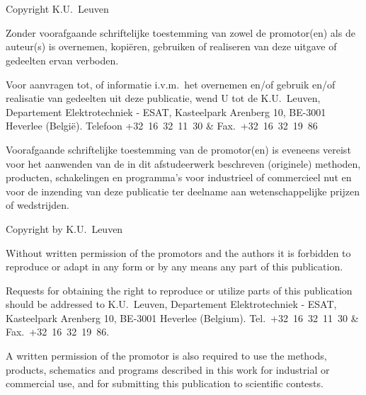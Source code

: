 \section*{}
\thispagestyle{empty}

\vfill

Copyright K.U.\ Leuven

\bigskip \noindent Zonder voorafgaande schriftelijke toestemming van zowel de promotor(en) als de auteur(s) is overnemen, kopi\"eren, gebruiken of realiseren van deze uitgave of gedeelten ervan verboden. 

\medskip \noindent Voor aanvragen tot, of informatie i.v.m.\ het overnemen en/of gebruik en/of realisatie van gedeelten uit deze publicatie, wend U tot de K.U.\ Leuven, Departement Elektrotechniek - ESAT, Kasteelpark Arenberg 10, BE-3001 Heverlee (Belgi\"e). Telefoon \mbox{+32 16 32 11 30} \& Fax.\ \mbox{+32 16 32 19 86}

\medskip \noindent Voorafgaande schriftelijke toestemming van de promotor(en) is eveneens vereist voor het aanwenden van de in dit afstudeerwerk beschreven (originele) methoden, producten, schakelingen en programma's voor industrieel of commercieel nut en voor de inzending van deze publicatie ter deelname aan wetenschappelijke prijzen of wedstrijden.

\bigskip
\bigskip
\bigskip

\noindent Copyright by K.U.\ Leuven

\bigskip \noindent Without written permission of the promotors and the authors it is forbidden to reproduce or adapt in any form or by any means any part of this publication. 

\medskip \noindent Requests for obtaining the right to reproduce or utilize parts of this publication should be addressed to K.U.\ Leuven, Departement Elektrotechniek - ESAT, Kasteelpark Arenberg 10,  BE-3001 Heverlee  (Belgium). Tel.\ \mbox{+32 16 32 11 30} \& Fax.\ \mbox{+32 16 32 19 86}.

\medskip \noindent A written permission of the promotor is also required to use the methods, products, schematics and programs described in this work for industrial or commercial use, and for submitting this publication to scientific contests.

\clearpage
